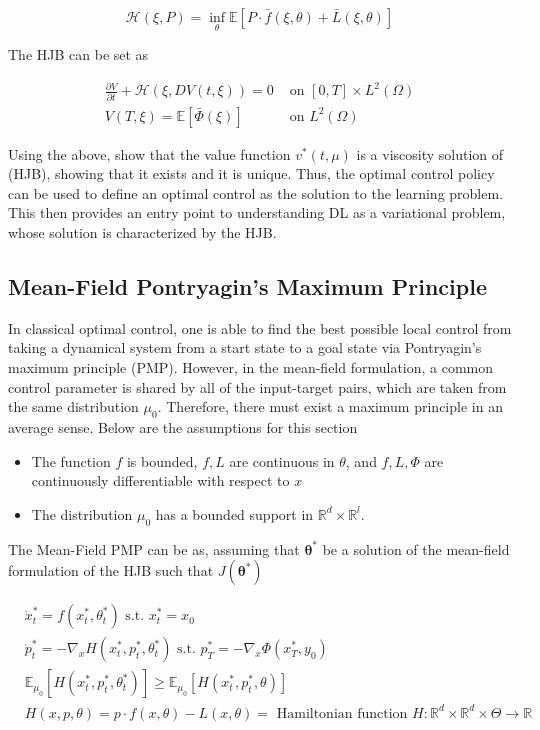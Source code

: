 \begin{equation*}
    \mathcal{H}(\xi, P) = \inf_\theta \mathbb{E} [P \cdot \bar{f}(\xi,\theta) + \bar{L}(\xi,\theta)]
\end{equation*}

The HJB can be set as

\begin{align*}
    \frac{\partial V}{\partial t} + \mathcal{H}(\xi,DV(t,\xi)) = 0 & \text{ on } [0,T] \times L^2(\Omega) \\
    V(T,\xi) = \mathbb{E}[\bar{\Phi}(\xi)] & \text{ on } L^2(\Omega)
\end{align*}

Using the above, \cite{meanfield} show that the value function $v^*(t,\mu)$ is a viscosity solution of (HJB), showing that it exists and it is unique. Thus, the optimal control policy can be used to define an optimal control as the solution to the learning problem. This then provides an entry point to understanding DL as a variational problem, whose solution is characterized by the HJB.

\subsection{Mean-Field Pontryagin's Maximum Principle}
In classical optimal control, one is able to find the best possible local control from taking a dynamical system from a start state to a goal state via Pontryagin's maximum principle (PMP). However, in the mean-field formulation, a common control parameter is shared by all of the input-target pairs, which are taken from the same distribution $\mu_0$. Therefore, there must exist a maximum principle in an average sense. Below are the assumptions for this section

\begin{itemize}
    \item The function $f$ is bounded, $f,L$ are continuous in $\theta$, and $f,L,\Phi$ are continuously differentiable with respect to $x$
    \item The distribution $\mu_0$ has a bounded support in $\mathbb{R}^d  \times \mathbb{R}^l$.
\end{itemize}

The Mean-Field PMP can be as, assuming that $\bm{\theta}^*$ be a solution of the mean-field formulation of the HJB such that $J(\bm{\theta}^*)$

\begin{align*}
    &\dot{x}_t^* = f(x_t^*, \theta_t^*) \text{ s.t. } x_t^* = x_0\\
    &\dot{p}_t^* = - \nabla_x H(x_t^*,p_t^*,\theta_t^*) \text{ s.t. } p_T^* = - \nabla_x \Phi(x_T^*, y_0) \\
    &\mathbb{E}_{\mu_0} [H(x_t^*,p_t^*,\theta_t^*)] \geq \mathbb{E}_{\mu_0} [H(x_t^*,p_t^*,\theta) ] \\
    &H(x,p,\theta) = p \cdot f(x,\theta) - L(x,\theta) = \text{ Hamiltonian function } H : \mathbb{R}^d \times \mathbb{R}^d \times \Theta \rightarrow \mathbb{R}
\end{align*}

